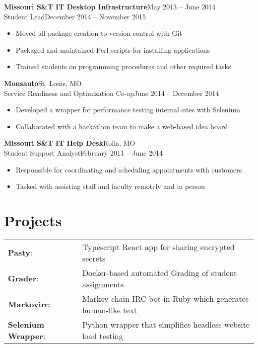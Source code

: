 \documentclass[margin]{res}
\newcommand{\github}[0]%
{%
  \hspace{-4mm}\faGithubSign\hspace{1mm}%
}
\begin{document}
\begin{resume}
       \textbf{Missouri S\&T IT Desktop Infrastructure}\hfill May 2013 -- June 2014\\
       Student Lead\hfill December 2014 -- November 2015
       \begin{itemize} \itemsep -1pt  %
         \item Moved all package creation to version control with Git
         \item Packaged and maintained Perl scripts for installing applications
         \item Trained students on programming procedures and other required tasks
       \end{itemize}

       \textbf{Monsanto}\hfill St. Louis, MO\\
       Service Readiness and Optimization Co-op\hfill June 2014 -- December 2014
       \begin{itemize} \itemsep -1pt  %
         \item Developed a wrapper for performance testing internal sites with Selenium
         \item Collaborated with a hackathon team to make a web-based idea board
       \end{itemize}

       \textbf{Missouri S\&T IT Help Desk}\hfill Rolla, MO\\
       Student Support Analyst\hfill February 2011 -- June 2014
       \begin{itemize} \itemsep -1pt  %
         \item Responsible for coordinating and scheduling appointments with customers
         \item Tasked with assisting staff and faculty remotely and in person
       \end{itemize}

    \section{Projects}
      \begin{tabular}{l p{4in}}
        \github\textbf{Pasty}:                & Typescript React app for sharing encrypted secrets \\ [1pt]
        \github\textbf{Grader}:               & Docker-based automated Grading of student assignments \\ [1pt]
        \github\textbf{Markovirc}:            & Markov chain IRC bot in Ruby which generates human-like text \\ [1pt]
        \github\textbf{Selenium Wrapper}:     & Python wrapper that simplifies headless website load testing \\ [1pt]
      \end{tabular}


\end{resume}
\end{document}
